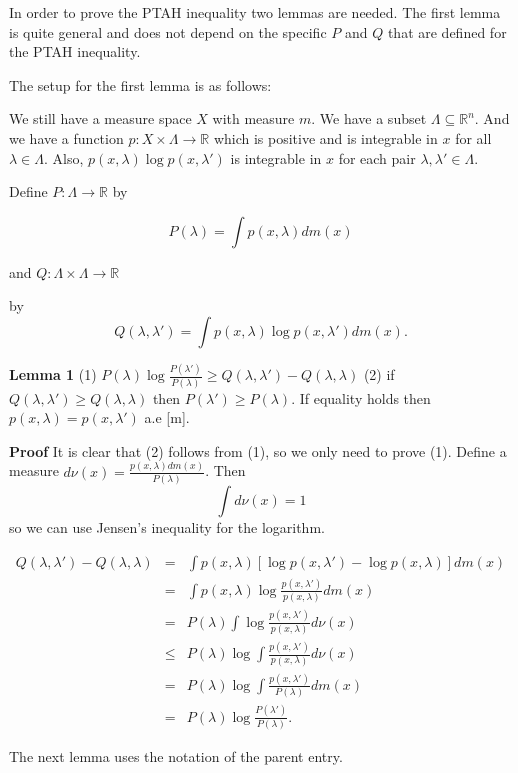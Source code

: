 \documentclass[12pt]{article}
\begin{document}
In order to prove the PTAH inequality two lemmas are needed. 
The first lemma is quite general and does not depend on the specific
$P$ and $Q$ that are defined for the PTAH inequality. 

The setup for the first lemma is as follows:

We still have a measure space $X$ with measure $m$.
We have a subset $\Lambda \subseteq {\mathbb{R}}^{n}$.
And we have a function $p: X \times \Lambda \to \mathbb{R}$ which is 
positive and is integrable in $x$ for all $\lambda \in \Lambda$.
Also, $p(x,\lambda )\log p(x, \lambda')$ is integrable in $x$ for each
pair $\lambda, \lambda' \in \Lambda$.

Define $P: \Lambda \to \mathbb{R}$ by

$$
P(\lambda ) = \int p(x,\lambda ) dm(x)
$$

and $Q: \Lambda \times \Lambda \to \mathbb{R}$

by
$$
Q(\lambda, \lambda' ) = \int p(x,\lambda ) \log p(x, \lambda') dm(x).
$$

\textbf{Lemma 1} (1) $P(\lambda ) \log \frac{P(\lambda')}{P(\lambda)} \ge Q(\lambda , \lambda' ) - Q(\lambda, \lambda) $
\newline
(2) if $Q(\lambda , \lambda') \ge Q(\lambda , \lambda) $ then
$P(\lambda') \ge P(\lambda)$. If equality holds then $p(x,\lambda) = p(x,\lambda')$ a.e [m].

\textbf{Proof} It is clear that (2) follows from (1), so we only need to prove (1). Define a measure $d\nu(x) = \frac{p(x,\lambda)dm(x)}{P(\lambda)}$.
Then 
$$
\int d\nu(x) = 1
$$
so we can use Jensen's inequality for the logarithm.

\begin{eqnarray*}
Q(\lambda, \lambda')- Q(\lambda , \lambda ) &=& \int p(x,\lambda )[\log p(x, \lambda' ) - \log p(x, \lambda ) ] dm(x) \\
&=& \int p(x,\lambda ) \log \frac{p(x,\lambda')}{p(x,\lambda)} dm(x) \\
& =& P(\lambda) \int \log \frac{p(x,\lambda')}{p(x,\lambda)} d\nu(x) \\
& \le& P(\lambda) \log \int \frac{p(x,\lambda')}{p(x,\lambda)} d\nu(x) \\
& =& P(\lambda ) \log \int \frac{p(x, \lambda')}{P(\lambda)} dm(x) \\
& =& P(\lambda) \log \frac{P(\lambda')}{P(\lambda)}.
\end{eqnarray*} 

The  next lemma uses the notation of the parent entry.
\end{document}
